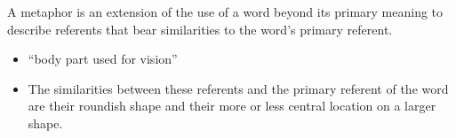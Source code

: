 \documentclass[headrule,footrule]{foils}
\begin{document}
A metaphor is an extension of the use of a word beyond its
primary meaning to describe referents that bear similarities to
the word's primary referent.
\begin{itemize}
\item {} ``body part used for vision''
  \begin{exe}
  \ex {} 
  \ex {}
  \ex {} 
  \end{exe}
\item The similarities between these referents and the primary referent of
the word  are their roundish shape and their more or less central
location on a larger shape.
\end{itemize}


\end{document}
